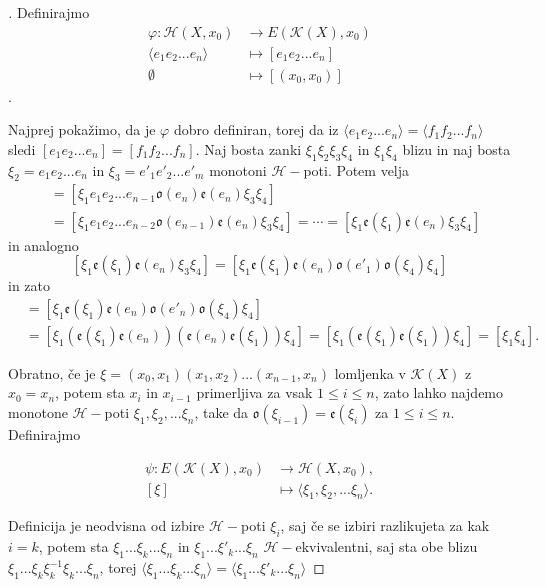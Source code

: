 \documentclass[a4paper,12pt]{article}
\DeclareRobustCommand{\k}{
    \mathcal{K}
}
\DeclareRobustCommand{\h}{
    \mathcal{H}
}
\theoremstyle{definition}
\theoremstyle{plain}
\theoremstyle{definition}
\theoremstyle{plain}
\theoremstyle{plain}
\theoremstyle{plain}
\theoremstyle{plain}
\newenvironment{dokaz}{\begin{proof}[\bfseries\upshape\proofname]}{\end{proof}}
\begin{document}
\begin{dokaz}
    Definirajmo 
    \begin{align*}
\varphi:\mathcal{H}(X,x_0)&\rightarrow E(\k(X),x_0)\\
\langle e_1e_2...e_n\rangle&\mapsto [e_1e_2...e_n]\\
\emptyset &\mapsto [(x_0,x_0)]
    \end{align*}.

    Najprej pokažimo, da je $\varphi$ dobro definiran, torej da iz  $\langle e_1e_2...e_n\rangle =\langle f_1f_2...f_n\rangle $ sledi $[e_1e_2...e_n]=[f_1f_2...f_n]$.
    Naj bosta zanki $\xi_1 \xi_2 \xi_3 \xi_4$ in $\xi_1 \xi_4 $ blizu in naj bosta $\xi_2 = e_1e_2...e_n$ in $\xi_3 = e'_1e'_2...e'_m$ monotoni $\h-$poti. Potem velja 
\begin{align*}
    [\xi_1 \xi_2 \xi_3 \xi_4]&=[\xi_1 e_1e_2...e_{n-1}\mathfrak{o}(e_n)\mathfrak{e}(e_n) \xi_3 \xi_4]\\
    &=[\xi_1 e_1e_2...e_{n-2}\mathfrak{o}(e_{n-1})\mathfrak{e}(e_n) \xi_3 \xi_4]=\cdots=[\xi_1\mathfrak{e}(\xi_1)\mathfrak{e}(e_n) \xi_3 \xi_4]
\end{align*}
in analogno 
$$
[\xi_1\mathfrak{e}(\xi_1)\mathfrak{e}(e_n) \xi_3 \xi_4]=[\xi_1\mathfrak{e}(\xi_1)\mathfrak{e}(e_n) \mathfrak{o}(e'_1)\mathfrak{o}(\xi_4) \xi_4]
$$
in zato 
\begin{align*}
    [\xi_1 \xi_2 \xi_3 \xi_4]&=[\xi_1\mathfrak{e}(\xi_1)\mathfrak{e}(e_n) \mathfrak{o}(e'_n)\mathfrak{o}(\xi_4) \xi_4]\\
    &=[\xi_1(\mathfrak{e}(\xi_1)\mathfrak{e}(e_n)) (\mathfrak{e}(e_n)\mathfrak{e}(\xi_1)) \xi_4]=[\xi_1(\mathfrak{e}(\xi_1) \mathfrak{e}(\xi_1)) \xi_4]=[\xi_1 \xi_4].
\end{align*}


Obratno, če je $\xi =(x_0,x_1)(x_1,x_2)...(x_{n-1},x_n)$ lomljenka v $\k(X)$ z $x_0=x_n$, potem sta $x_i$ in $x_{i-1}$ primerljiva za vsak $1\leq i \leq n$, zato lahko najdemo monotone $\h-$poti $\xi_1, \xi_2,... \xi_n$, take da $\mathfrak{o}(\xi_{i-1})=\mathfrak{e}(\xi_i)$ za $1\leq i \leq n$. Definirajmo

\begin{align*}
    \psi: E(\k(X),x_0)&\rightarrow \mathcal{H}(X,x_0),\\
    [\xi]&\mapsto \langle\xi_1, \xi_2,... \xi_n\rangle.
\end{align*}

Definicija je neodvisna od izbire $\h-$poti $\xi_i$, saj če se izbiri razlikujeta za kak $i=k$, potem sta $\xi_1...\xi_k...\xi_n$ in $\xi_1...\xi'_k...\xi_n$ $\h-$ekvivalentni, saj sta obe blizu $\xi_1...\xi_k\xi_k^{-1}\xi_k...\xi_n$, torej $\langle \xi_1...\xi_k...\xi_n \rangle = \langle \xi_1...\xi'_k...\xi_n \rangle$


\end{dokaz}
\end{document}
